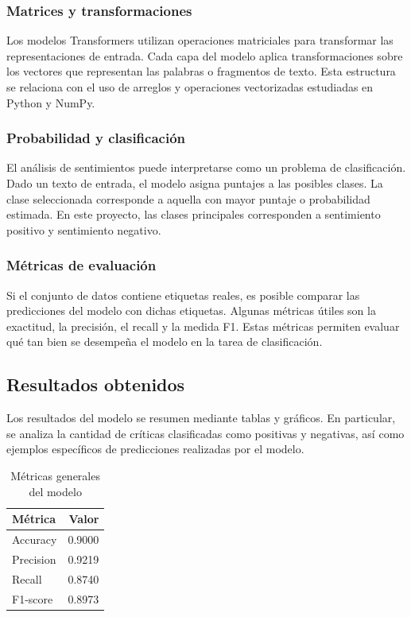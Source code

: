 \documentclass[11pt,letterpaper]{article}
\begin{document}
	\subsubsection{Matrices y transformaciones}
	
	Los modelos Transformers utilizan operaciones matriciales para transformar las representaciones de entrada. Cada capa del modelo aplica transformaciones sobre los vectores que representan las palabras o fragmentos de texto. Esta estructura se relaciona con el uso de arreglos y operaciones vectorizadas estudiadas en Python y NumPy.
	
	\subsubsection{Probabilidad y clasificación}
	
	El análisis de sentimientos puede interpretarse como un problema de clasificación. Dado un texto de entrada, el modelo asigna puntajes a las posibles clases. La clase seleccionada corresponde a aquella con mayor puntaje o probabilidad estimada. En este proyecto, las clases principales corresponden a sentimiento positivo y sentimiento negativo.
	
	\subsubsection{Métricas de evaluación}
	
	Si el conjunto de datos contiene etiquetas reales, es posible comparar las predicciones del modelo con dichas etiquetas. Algunas métricas útiles son la exactitud, la precisión, el recall y la medida F1. Estas métricas permiten evaluar qué tan bien se desempeña el modelo en la tarea de clasificación.
	
	\subsection{Resultados obtenidos}
	
	Los resultados del modelo se resumen mediante tablas y gráficos. En particular, se analiza la cantidad de críticas clasificadas como positivas y negativas, así como ejemplos específicos de predicciones realizadas por el modelo.
	
	\begin{table}[H]
		\centering
		\caption{Métricas generales del modelo}
		\label{tab:metricas-modelo}
		\begin{tabular}{lr}
			\toprule
			Métrica & Valor \\
			\midrule
			Accuracy & 0.9000 \\
			Precision & 0.9219 \\
			Recall & 0.8740 \\
			F1-score & 0.8973 \\
			\bottomrule
		\end{tabular}
	\end{table}
	
\end{document}
